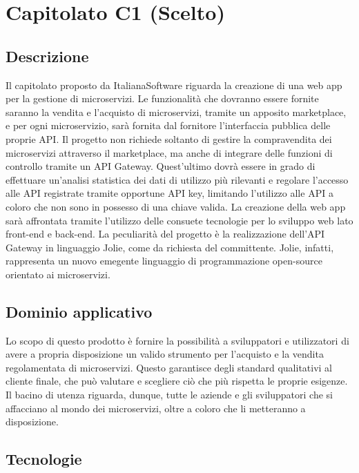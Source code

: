 \newpage
\section{Capitolato C1 (Scelto)}

\subsection{Descrizione}

Il capitolato proposto da ItalianaSoftware riguarda la creazione di
una web app per la gestione di microservizi. Le funzionalità che dovranno essere fornite saranno la vendita e l'acquisto di microservizi, tramite un apposito marketplace, e per ogni microservizio, sarà fornita dal fornitore l'interfaccia pubblica delle proprie API. Il progetto non richiede soltanto di gestire la compravendita dei microservizi attraverso il marketplace, ma anche di integrare delle funzioni di controllo tramite un API Gateway.
Quest'ultimo dovrà essere in grado di effettuare un'analisi statistica dei dati di utilizzo più rilevanti e regolare l'accesso alle API registrate
tramite opportune API key, limitando l'utilizzo alle API a coloro che
non sono in possesso di una chiave valida. La creazione della web
app sarà affrontata tramite l'utilizzo delle consuete tecnologie per
lo sviluppo web lato front-end e back-end. La peculiarità del progetto
è la realizzazione dell'API Gateway in linguaggio Jolie, come da richiesta
del committente. Jolie, infatti, rappresenta un nuovo emegente linguaggio
di programmazione open-source orientato ai microservizi.

\subsection{Dominio applicativo}

Lo scopo di questo prodotto è fornire la possibilità a sviluppatori
e utilizzatori di avere a propria disposizione un valido strumento
per l'acquisto e la vendita regolamentata di microservizi. Questo
garantisce degli standard qualitativi al cliente finale, che
può valutare e scegliere ciò che più rispetta le proprie esigenze.
Il bacino di utenza riguarda, dunque, tutte le aziende e gli sviluppatori
che si affacciano al mondo dei microservizi, oltre a coloro che li
metteranno a disposizione.

\subsection{Tecnologie}

